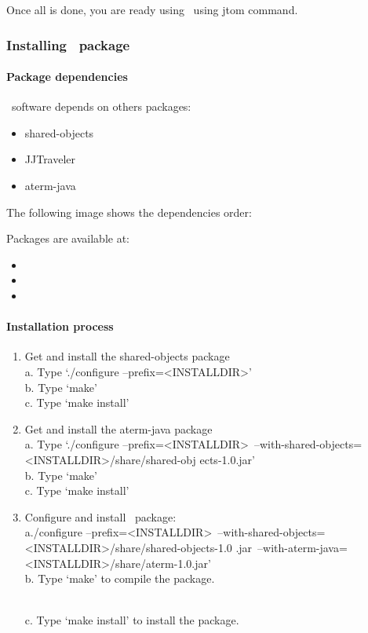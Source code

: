 Once all is done, you are ready using \TOM\ using jtom command.

\subsubsection{Installing \TOM\ package}
\paragraph{Package dependencies}
\TOM\ software depends on others packages:
\begin{itemize}
\item shared-objects
\item JJTraveler
\item aterm-java
\end{itemize}
The following image shows the dependencies order:


Packages are available at:
\begin{itemize}
\item {}
\item {}
\item {}
\end{itemize}    

\paragraph{Installation process}
\begin{enumerate}
\item Get and install the shared-objects package
         \\a. Type `./configure --prefix=<INSTALLDIR>'
         \\b. Type `make'
         \\c. Type `make install'
\item Get and install the aterm-java package
         \\a. Type `./configure --prefix=<INSTALLDIR>\
                              --with-shared-objects=<INSTALLDIR>/share/shared-obj
ects-1.0.jar'
         \\b. Type `make'
         \\c. Type `make install'

\item Configure and install \TOM\ package:
         \\a./configure --prefix=<INSTALLDIR>\
                      --with-shared-objects=<INSTALLDIR>/share/shared-objects-1.0
.jar\
                      --with-aterm-java=<INSTALLDIR>/share/aterm-1.0.jar'
         \\b. Type `make' to compile the package.

         \\c. Type `make install' to install the package.
\end{enumerate}


